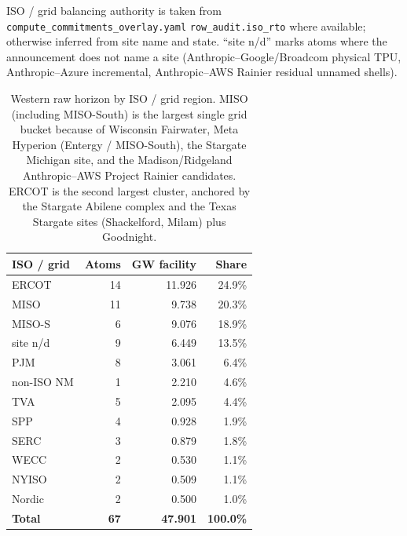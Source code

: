 \documentclass[11pt,a4paper]{article}
\begin{document}
\noindent ISO / grid balancing authority is taken from \texttt{compute\_commitments\_overlay.yaml} \texttt{row\_audit.iso\_rto} where available; otherwise inferred from site name and state. ``site n/d'' marks atoms where the announcement does not name a site (Anthropic--Google/Broadcom physical TPU, Anthropic--Azure incremental, Anthropic--AWS Rainier residual unnamed shells).
\begin{table}[H]
\centering\small
\begin{tabular}{@{}lrrr@{}}
\toprule
\textbf{ISO / grid} & \textbf{Atoms} & \textbf{GW facility} & \textbf{Share} \\
\midrule

ERCOT & 14 & 11.926 & 24.9\% \\

MISO & 11 & 9.738 & 20.3\% \\

MISO-S & 6 & 9.076 & 18.9\% \\

site n/d & 9 & 6.449 & 13.5\% \\

PJM & 8 & 3.061 & 6.4\% \\

non-ISO NM & 1 & 2.210 & 4.6\% \\

TVA & 5 & 2.095 & 4.4\% \\

SPP & 4 & 0.928 & 1.9\% \\

SERC & 3 & 0.879 & 1.8\% \\

WECC & 2 & 0.530 & 1.1\% \\

NYISO & 2 & 0.509 & 1.1\% \\

Nordic & 2 & 0.500 & 1.0\% \\

\midrule\textbf{Total} & \textbf{67} & \textbf{47.901} & \textbf{100.0\%} \\

\bottomrule
\end{tabular}
\caption{Western raw horizon by ISO / grid region. MISO (including MISO-South) is the largest single grid bucket because of Wisconsin Fairwater, Meta Hyperion (Entergy / MISO-South), the Stargate Michigan site, and the Madison/Ridgeland Anthropic--AWS Project Rainier candidates. ERCOT is the second largest cluster, anchored by the Stargate Abilene complex and the Texas Stargate sites (Shackelford, Milam) plus Goodnight.}
\end{table}
\end{document}
